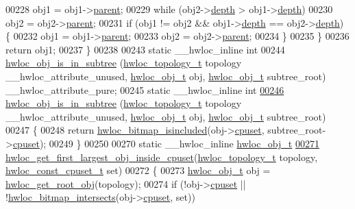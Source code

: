 \begin{DoxyCode}
00228       obj1 = obj1->\hyperlink{a00016_adc494f6aed939992be1c55cca5822900}{parent};
00229     \textcolor{keywordflow}{while} (obj2->\hyperlink{a00016_a9d82690370275d42d652eccdea5d3ee5}{depth} > obj1->\hyperlink{a00016_a9d82690370275d42d652eccdea5d3ee5}{depth})
00230       obj2 = obj2->\hyperlink{a00016_adc494f6aed939992be1c55cca5822900}{parent};
00231     \textcolor{keywordflow}{if} (obj1 != obj2 && obj1->\hyperlink{a00016_a9d82690370275d42d652eccdea5d3ee5}{depth} == obj2->\hyperlink{a00016_a9d82690370275d42d652eccdea5d3ee5}{depth}) \{
00232       obj1 = obj1->\hyperlink{a00016_adc494f6aed939992be1c55cca5822900}{parent};
00233       obj2 = obj2->\hyperlink{a00016_adc494f6aed939992be1c55cca5822900}{parent};
00234     \}
00235   \}
00236   \textcolor{keywordflow}{return} obj1;
00237 \}
00238 
00243 \textcolor{keyword}{static} \_\_hwloc\_inline \textcolor{keywordtype}{int}
00244 \hyperlink{a00053_ga08b5c1c1a95ed27a219c8af864690b3e}{hwloc_obj_is_in_subtree} (\hyperlink{a00039_ga9d1e76ee15a7dee158b786c30b6a6e38}{hwloc_topology_t} topology \_\_hwloc\_attribute\_unused, 
      \hyperlink{a00016}{hwloc_obj_t} obj, \hyperlink{a00016}{hwloc_obj_t} subtree\_root) \_\_hwloc\_attribute\_pure;
00245 \textcolor{keyword}{static} \_\_hwloc\_inline \textcolor{keywordtype}{int}
\hypertarget{a00031_source_l00246}{}\hyperlink{a00053_ga08b5c1c1a95ed27a219c8af864690b3e}{00246} \hyperlink{a00053_ga08b5c1c1a95ed27a219c8af864690b3e}{hwloc_obj_is_in_subtree} (\hyperlink{a00039_ga9d1e76ee15a7dee158b786c30b6a6e38}{hwloc_topology_t} topology \_\_hwloc\_attribute\_unused, 
      \hyperlink{a00016}{hwloc_obj_t} obj, \hyperlink{a00016}{hwloc_obj_t} subtree\_root)
00247 \{
00248   \textcolor{keywordflow}{return} \hyperlink{a00065_gaae29e14a926c198e8f91e6e4790621e7}{hwloc_bitmap_isincluded}(obj->\hyperlink{a00016_a67925e0f2c47f50408fbdb9bddd0790f}{cpuset}, subtree\_root->\hyperlink{a00016_a67925e0f2c47f50408fbdb9bddd0790f}{cpuset});
00249 \}
00250 
00270 \textcolor{keyword}{static} \_\_hwloc\_inline \hyperlink{a00016}{hwloc_obj_t}
\hypertarget{a00031_source_l00271}{}\hyperlink{a00054_gabcd5fa81a95fa5335950cae092277d5b}{00271} \hyperlink{a00054_gabcd5fa81a95fa5335950cae092277d5b}{hwloc_get_first_largest_obj_inside_cpuset}(\hyperlink{a00039_ga9d1e76ee15a7dee158b786c30b6a6e38}{hwloc_topology_t} topology, 
      \hyperlink{a00040_ga1f784433e9b606261f62d1134f6a3b25}{hwloc_const_cpuset_t} \textcolor{keyword}{set})
00272 \{
00273   \hyperlink{a00016}{hwloc_obj_t} obj = \hyperlink{a00053_gadbf58f6e187efbdb3cd9a8e30311b7d7}{hwloc_get_root_obj}(topology);
00274   \textcolor{keywordflow}{if} (!obj->\hyperlink{a00016_a67925e0f2c47f50408fbdb9bddd0790f}{cpuset} || !\hyperlink{a00065_ga575c27953709a8cb9a047aae65157526}{hwloc_bitmap_intersects}(obj->\hyperlink{a00016_a67925e0f2c47f50408fbdb9bddd0790f}{cpuset}, \textcolor{keyword}{set}))

\end{DoxyCode}
